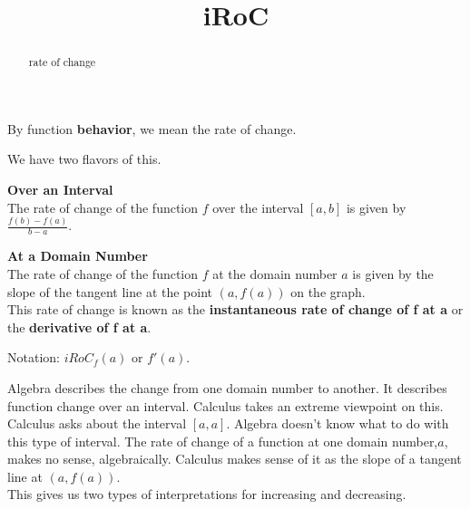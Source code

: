 \documentclass{ximera}
\title{iRoC}
\begin{document}
\begin{abstract}
rate of change
\end{abstract}
\maketitle




By function \textbf{behavior}, we mean the rate of change.


We have two flavors of this.




\begin{fact} \textbf{\textcolor{blue!55!black}{Over an Interval}}    \\


The rate of change of the function $f$ over the interval $[a, b]$ is given by $\frac{f(b) - f(a)}{b - a}$.


\end{fact}






\begin{fact} \textbf{\textcolor{blue!55!black}{At a Domain Number}}   \\


The rate of change of the function $f$ at the domain number $a$ is given by the slope of the tangent line at the point $(a, f(a))$ on the graph. \\


This rate of change is known as the \textbf{\textcolor{purple!85!blue}{instantaneous rate of change of f at a}} or the \textbf{\textcolor{purple!85!blue}{derivative of f at a}}.


Notation: \textbf{\textcolor{purple!85!blue}{$iRoC_f(a)$}} or \textbf{\textcolor{purple!85!blue}{$f'(a)$}}.


\end{fact}
Algebra describes the change from one domain number to another. It describes function change over an interval. Calculus takes an extreme viewpoint on this.  Calculus asks about the interval $[a,a]$. Algebra doesn't know what to do with this type of interval. The rate of change of a function at one domain number,$a$, makes no sense, algebraically. Calculus makes sense of it as the slope of a tangent line at $(a, f(a))$. \\

This gives us two types of interpretations for increasing and decreasing. \\
\end{document}
